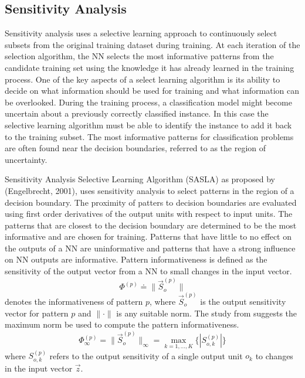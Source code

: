 \documentclass[conference]{IEEEtran}
\begin{document}
	\subsection{Sensitivity Analysis}
	Sensitivity analysis uses a selective learning approach to continuously select subsets from the original training dataset during training. At each iteration of the selection algorithm, the NN selects the most informative patterns from the candidate training set using the knowledge it has already learned in the training process. One of the key aspects of a select learning algorithm is its ability to decide on what information should be used for training and what information can be overlooked. During the training process, a classification model might become uncertain about a previously correctly classified instance. In this case the selective learning algorithm must be able to identify the instance to add it back to the training subset. The most informative patterns for classification problems are often found near the decision boundaries, referred to as the region of uncertainty.
	
	Sensitivity Analysis Selective Learning Algorithm (SASLA) as proposed by (Engelbrecht, 2001), uses sensitivity analysis to select patterns in the region of a decision boundary. The proximity of patters to decision boundaries are evaluated using first order derivatives of the output units with respect to input units. The patterns that are closest to the decision boundary are determined to be the most informative and are chosen for training. Patterns that have little to no effect on the outputs of a NN are uninformative and patterns that have a strong influence on NN outputs are informative. Pattern informativeness is defined as the sensitivity of the output vector from a NN to small changes in the input vector. 
	$$
	\Phi^{(p)} \doteq \lVert\vec{S}_o^{(p)}\lVert
	$$
	denotes the informativeness of pattern $p$, where $\vec{S}_o^{(p)}$ is the output sensitivity vector for pattern $p$ and $\lVert\cdot\lVert$ is any suitable norm. 
	The study from \cite{engelbrecht2001} suggests the maximum norm be used to compute the pattern informativeness.
	$$
	\Phi_\infty^{(p)} = \lVert\vec{S}_o^{(p)}\lVert_\infty = \max_{k=1,...,K}\{|S_{o,k}^{(p)}|\}
	$$
	where $S_{o,k}^{(p)}$ refers to the output sensitivity of a single output unit $o_k$ to changes in the input vector $\vec{z}$.
	
\end{document}
